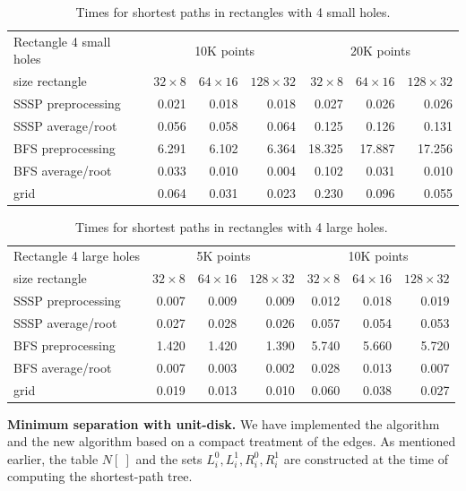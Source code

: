 \documentclass[a4paper,USenglish]{lipics}
\def\myparagraph#1{\medskip\noindent\textbf{#1.}}
\begin{document}
\begin{table}
\begin{tabular}{l*{3}{r}|*{3}{r}}
Rectangle 4 small holes & \multicolumn{3}{c|}{10K points} & \multicolumn{3}{c}{20K points}\\
size rectangle	&	$32\times 8$	&	$64\times 16$	&	$128\times 32$	&	$32\times 8$	&	$64\times 16$	&	$128\times 32$\\						
\hline
SSSP preprocessing	&	0.021	&	0.018	&	0.018	&	0.027	&	0.026	&	0.026	\\
SSSP average/root	&	0.056	&	0.058	&	0.064	&	0.125	&	0.126	&	0.131	\\
BFS preprocessing	&	6.291	&	6.102	&	6.364	&	18.325	&	17.887	&	17.256	\\
BFS average/root	&	0.033	&	0.010	&	0.004	&	0.102	&	0.031	&	0.010	\\
grid				&	0.064	&	0.031	&	0.023	&	0.230	&	0.096	&	0.055
\end{tabular}
\caption{Times for shortest paths in rectangles with 4 small holes.}
\label{table4}
\end{table}


\begin{table}
\begin{tabular}{l*{3}{r}|*{3}{r}}
Rectangle 4 large holes & \multicolumn{3}{c|}{5K points} & \multicolumn{3}{c}{10K points}\\
size rectangle	&	$32\times 8$	&	$64\times 16$	&	$128\times 32$	&	$32\times 8$	&	$64\times 16$	&	$128\times 32$\\						
\hline
SSSP preprocessing	&	0.007	&	0.009	&	0.009	&	0.012	&	0.018	&	0.019	\\
SSSP average/root	&	0.027	&	0.028	&	0.026	&	0.057	&	0.054	&	0.053	\\
BFS preprocessing	&	1.420	&	1.420	&	1.390	&	5.740	&	5.660	&	5.720	\\
BFS average/root	&	0.007	&	0.003	&	0.002	&	0.028	&	0.013	&	0.007	\\
grid				&	0.019	&	0.013	&	0.010	&	0.060	&	0.038	&	0.027
\end{tabular}
\caption{Times for shortest paths in rectangles with 4 large holes.}
\label{table5}
\end{table}



\myparagraph{Minimum separation with unit-disk}
We have implemented the algorithm 
and the new algorithm based on a compact treatment of the edges.
As mentioned earlier, the table $N[~]$ and the sets $L^0_i,L^1_i,R^0_i,R^1_i$
are constructed at the time of computing the shortest-path tree.
\end{document}
